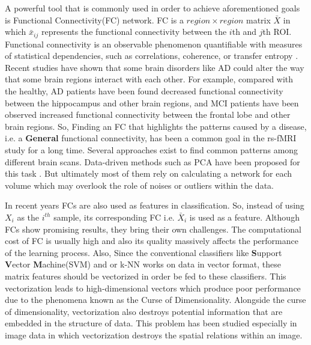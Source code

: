 \documentclass[preprint,12pt]{elsarticle}
\begin{document}
	A powerful tool that is commonly used in order to achieve aforementioned goals is Functional Connectivity(FC) network.  FC is a $region \times region$ matrix $\bar{X}$ in which $\bar{x}_{ij}$ represents the functional connectivity between the $i$th and $j$th ROI. Functional connectivity is an observable
		phenomenon quantifiable with measures of statistical dependencies, such as correlations, coherence, or transfer entropy \cite{r38}.  Recent studies have shown that some brain disorders like AD could alter the way that some brain regions interact with each other. For example, compared with the healthy, AD patients have been found decreased functional connectivity between the hippocampus and other brain regions, and MCI patients have been observed increased functional connectivity between the frontal lobe and other brain regions\cite{r04}.
		So, Finding an FC that highlights the patterns caused by a disease, i.e. a \textbf{General} functional connectivity, has been a common goal in the rs-fMRI study for a long time. Several approaches exist to find common patterns among different brain scans. Data-driven methods such as PCA have been proposed for this task \cite{r55}. But ultimately most of them rely on calculating a network for each volume which may overlook the role of noises or outliers within the data\cite{r53,r54}. 
	
		In recent years FCs are also used as features in classification. 
		So, instead of using $X_i$ as the $i^{th}$ sample, its corresponding  FC i.e. $\bar{X}_i$ is used as a feature. Although FCs show promising results, they bring their own challenges.  The computational cost of FC is usually high and also its quality massively affects the performance of the learning process. Also, Since the conventional classifiers like \textbf{S}upport \textbf{V}ector \textbf{M}achine(SVM) and or k-NN works on data in vector format, these matrix features should be vectorized in order be fed to these classifiers.
		This vectorization leads to high-dimensional vectors which produce poor performance due to the phenomena known as the Curse of Dimensionality. Alongside the curse of dimensionality, vectorization also destroys potential information that are embedded in the structure of data. 
		This problem has been studied especially in image data in which vectorization destroys the spatial relations within an image\cite{r60}.
						
\end{document}
